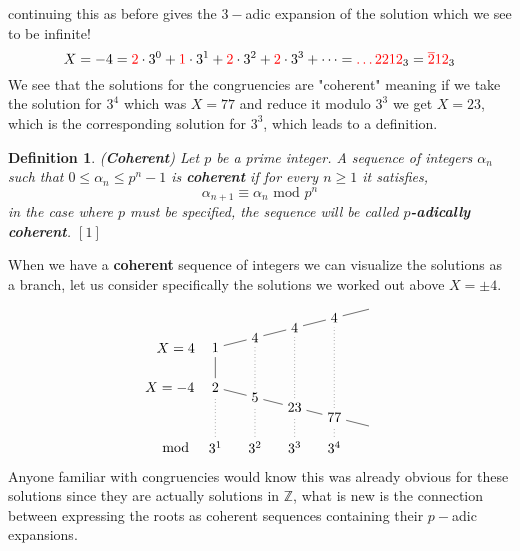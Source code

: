 \documentclass[12pt]{article}
\newtheorem{mydef}[thm]{Definition}
\theoremstyle{definition}
\theoremstyle{remark}
\newcommand{\zz}{\mathbb Z}   %
\renewcommand{\geq}{\geqslant}
\renewcommand{\leq}{\leqslant}
\newcommand{\lrb}[1]{\left[#1\right]}
\newcommand{\tcr}[1]{\textcolor{red}{#1}}
\begin{document}
  continuing this as before gives the $3-$adic expansion of the solution which we see to be infinite!
  \[X = -4 = \tcr{2}\cdot 3^{0} + \tcr{1}\cdot 3^{1} + \tcr{2}\cdot 3^{2} + \tcr{2}\cdot 3^{3} + \dots  = \tcr{\dots2212}_3 = \tcr{\overline{2}12}_3 \]
  We see that the solutions for the congruencies are "coherent" meaning if we take the solution for $3^{4}$ which was $X = 77$ and reduce it modulo $3^{3}$ we get $X = 23$, which is the corresponding solution for $3^{3}$, which leads to a definition.

  \begin{mydef}(\textbf{Coherent})
    Let $p$ be a prime integer. A sequence of integers $\alpha_n$ such that $0 \leq \alpha_n \leq p^{n} -1 $ is \textbf{coherent} if for every $n \geq 1$ it satisfies,
    \[\alpha_{n+1} \equiv \alpha_n \text{ mod }p^{n}\]
    in the case where $p$ must be specified, the sequence will be called \textbf{$p$-adically coherent}. $\lrb{1}$
  \end{mydef}

  When we have a \textbf{coherent} sequence of integers we can visualize the solutions as a branch, let us consider specifically the solutions we worked out above $X = \pm 4$. 
  \[
  \begin{tikzpicture}
    \node (1) at (0,1) {$ 1$};
    \node (2) at (0,0) {$2$};
    
    \node (4) at (1,1.25) {$4$};
    \node (7) at (2,1.5) {$4$};
    \node (8) at (3, 1.75) {$4$};
    \node (9) at (4, 2) {};

    \node (5) at (1, -0.25) {$5$};
    \node (23) at (2,-.5) {$23$};
    \node (77) at (3, -.75) {$77$};
    \node  (88) at (4, -1){};

    \node (sol1) at (-1, 1) {$X = 4$};
    \node (sol2) at (-1.15, 0) {$X = -4$};

    \draw (4) -- (1) -- (2) -- (5) -- (23) -- (77) -- (88);
    \draw (4) -- (7) -- (8) -- (9);

    \node (z) at (-1, -1.5) {mod};
    \node (a) at (0, -1.5) {$3^{1}$};
    \node (b) at (1, -1.5) {$3^{2}$};
    \node (c) at (2, -1.5) {$3^{3}$};
    \node (d) at (3, -1.5) {$3^{4}$};

    \draw[dotted] (a) -- (2); \draw[dotted] (b) -- (5) -- (4); \draw[dotted] (c) -- (23) -- (7) ; \draw[dotted] (d) -- (77) -- (8);
  \end{tikzpicture}
  \]
  Anyone familiar with congruencies would know this was already obvious for these solutions since they are actually solutions in $\zz$, what is new is the connection between expressing the roots as coherent sequences containing their $p-$adic expansions. 
\end{document}
